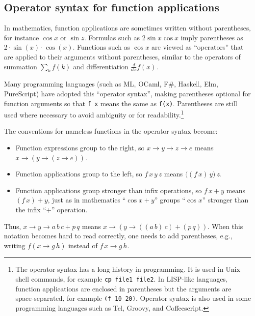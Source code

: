 \subsection{Operator syntax for function applications}

In mathematics, function applications are sometimes written without
parentheses, for instance $\cos x$ or $\sin z$. Formulas such as
$2\sin x\cos x$ imply parentheses as $2\cdot\sin\left(x\right)\cdot\cos\left(x\right)$.
Functions such as $\cos x$ are viewed as \textsf{``}operators\textsf{''} that are
applied to their arguments without parentheses, similar to the operators
of summation $\sum_{k}f(k)$ and differentiation $\frac{d}{dx}f(x)$.

Many programming languages (such as ML, OCaml, F\#, Haskell, Elm,
PureScript) have adopted this \textsf{``}operator syntax\textsf{''},
making parentheses optional for function arguments so that \lstinline!f x!
means the same as \lstinline!f(x)!. Parentheses are still used where
necessary to avoid ambiguity or for readability.\footnote{The operator syntax has a long history in programming. It is used
in Unix shell commands, for example \lstinline!cp file1 file2!. In
LISP-like languages, function applications are enclosed in parentheses
but the arguments are space-separated, for example \lstinline!(f 10 20)!.
Operator syntax is also used in some programming languages such as
Tcl, Groovy, and Coffeescript.}

The conventions for nameless functions in the operator syntax become:
\begin{itemize}
\item Function expressions group to the right, so $x\rightarrow y\rightarrow z\rightarrow e$
means $x\rightarrow\left(y\rightarrow\left(z\rightarrow e\right)\right)$.
\item Function applications group to the left, so $f\,x\,y\,z$ means $\big((f\,x)\,y\big)\,z$.
\item Function applications group stronger than infix operations, so $f\,x+y$
means $(f\,x)+y$, just as in mathematics \textsf{``}$\cos x+y$\textsf{''} groups
\textsf{``}$\cos x$\textsf{''} stronger than the infix \textsf{``}$+$\textsf{''} operation.
\end{itemize}
Thus, $x\rightarrow y\rightarrow a\,b\,c+p\,q$ means $x\rightarrow\left(y\rightarrow\left(\left(a\,b\right)\,c\right)+(p\,q)\right)$.
When this notation becomes hard to read correctly, one needs to add
parentheses, e.g., writing $f(x\rightarrow g\,h)$ instead of $f\,x\rightarrow g\,h$.


